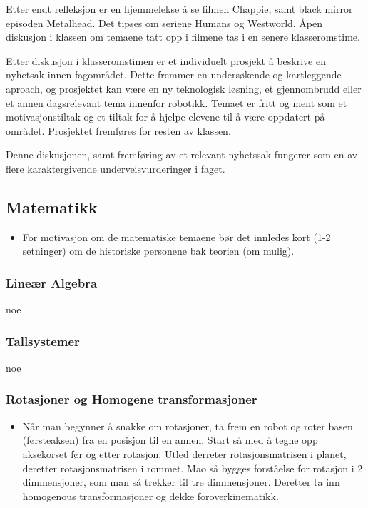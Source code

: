 \begin{itemize}
\begin{itemize}
            \end{itemize}
        Etter endt refleksjon er en hjemmelekse å se filmen Chappie, samt black mirror episoden Metalhead. Det tipses om seriene Humans og Westworld. Åpen diskusjon i klassen om temaene tatt opp i filmene tas i en senere klasseromstime.

        Etter diskusjon i klasseromstimen er et individuelt prosjekt å beskrive en nyhetsak innen fagområdet. Dette fremmer en undersøkende og kartleggende aproach, og prosjektet kan være en ny teknologisk løsning, et gjennombrudd eller et annen dagsrelevant tema innenfor robotikk. Temaet er fritt og ment som et motivasjonstiltak og et tiltak for å hjelpe elevene til å være oppdatert på området. Prosjektet fremføres for resten av klassen.

        Denne diskusjonen, samt fremføring av et relevant nyhetssak fungerer som en av flere karaktergivende underveisvurderinger i faget.
    \end{itemize}



\subsection{Matematikk}


    \begin{itemize}
        \item For motivasjon om de matematiske temaene bør det innledes kort (1-2 setninger) om de historiske personene bak teorien (om mulig).
    \end{itemize}


    \subsubsection{Lineær Algebra}
        noe


    \subsubsection{Tallsystemer}
        noe


    \subsubsection{Rotasjoner og Homogene transformasjoner}
        \begin{itemize}
            \item Når man begynner å snakke om rotasjoner, ta frem en robot og roter basen (førsteaksen) fra en posisjon til en annen. Start så med å tegne opp aksekorset før og etter rotasjon. Utled derreter rotasjonsmatrisen i planet, deretter rotasjonsmatrisen i rommet. Mao så bygges forståelse for rotasjon i 2 dimmensjoner, som man så trekker til tre dimmensjoner. Deretter ta inn homogenous transformasjoner og dekke foroverkinematikk.
        \end{itemize}


